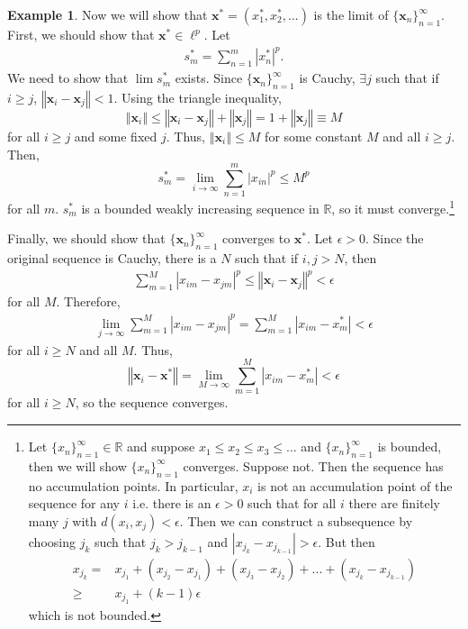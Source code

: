 \documentclass[12pt,reqno]{amsart}
\theoremstyle{definition}
\newtheorem{example}{Example}[section]
\def\R{\mathbb{R}}
\newcommand{\norm}[1]{\left\Vert {#1} \right\Vert}
\newcommand{\abs}[1]{\left\vert {#1} \right\vert}
\newcommand{\seq}[1]{\{{#1}_n \}_{n=1}^\infty }
\begin{document}
\begin{example}
  Now we will show that $\mathbf{x}^\ast = (x_{1}^\ast, x_{2}^\ast,
  ... )$ is the limit of $\seq{\mathbf{x}}$.  First, we should show
  that $\mathbf{x}^\ast \in \ell^p$. Let 
  \begin{align*}
    s_m^\ast = \sum_{n=1}^m |x^\ast_n|^p.
  \end{align*}
  We need to show that $\lim s_m^\ast $ exists.  Since
  $\seq{\mathbf{x}}$ is Cauchy, $\exists j$ such that if $i \geq j$,
  $\norm{\mathbf{x}_i - \mathbf{x}_j} < 1$. Using the triangle
  inequality, 
  \[ \norm{\mathbf{x}_i} \leq \norm{\mathbf{x}_i - \mathbf{x}_j} +
  \norm{\mathbf{x}_j} = 1 + \norm{\mathbf{x}_j} \equiv M \]
  for all $i \geq j$ and some fixed $j$. Thus, $\norm{\mathbf{x}_i}
  \leq M$ for some constant $M$ and all $i \geq j$. Then, 
  \[
  s_m^\ast = \lim_{i \to \infty} \sum_{n=1}^m |x_{in}|^p \leq
  M^{p} \]
  for all $m$. $s_m^\ast$ is a bounded weakly increasing sequence in
  $\R$, so it must converge.\footnote{Let $\seq{x} \in \R$ and suppose $x_1
    \leq x_2 \leq x_3 \leq ...$ and $\seq{x}$ is bounded, then we will
    show $\seq{x}$ converges. Suppose not. Then the sequence has no
    accumulation points. In particular, $x_i$ is not an accumulation
    point of the sequence for any $i$ i.e. there is an $\epsilon>0$
    such that for all $i$ there are finitely many $j$ with $d(x_i,
    x_j) < \epsilon$. Then we can construct a subsequence
    by choosing $j_k$ such that $j_k> j_{k-1}$ and $|x_{j_k} -
    x_{j_{k-1}} | > \epsilon$. But then 
    \begin{align*}
      x_{j_k} = & x_{j_1} + (x_{j_2} - x_{j_1}) + (x_{j_3} - x_{j_2}) +
      ... + (x_{j_k} - x_{j_{k-1}} ) \\
      \geq & x_{j_1} + (k-1) \epsilon 
    \end{align*}
    which is not bounded.}
  
  Finally, we should show that $\seq{\mathbf{x}}$ converges to
  $\mathbf{x}^\ast$. Let $\epsilon>0$. 
  Since the original sequence is Cauchy, there is a $N$ such that if
  $i,j > N$, then
  \begin{align*}
    \sum_{m=1}^M \abs{x_{im} - x_{jm}}^p \leq \norm{\mathbf{x}_i -
      \mathbf{x}_j}^p < \epsilon
  \end{align*}
  for all $M$. Therefore, 
  \begin{align*}
    \lim_{j \to \infty} \sum_{m=1}^M \abs{x_{im} - x_{jm}}^p =
    \sum_{m=1}^M\abs{x_{im} - x_m^\ast} < \epsilon 
  \end{align*}
  for all $i \geq N$ and all $M$. Thus, 
  \[
  \norm{\mathbf{x}_i - \mathbf{x}^\ast} = \lim_{M \to \infty}
  \sum_{m=1}^M\abs{x_{im} - x_m^\ast} < \epsilon 
  \]
  for all $i \geq N$, so the sequence converges.
 \end{example}
\end{document}
